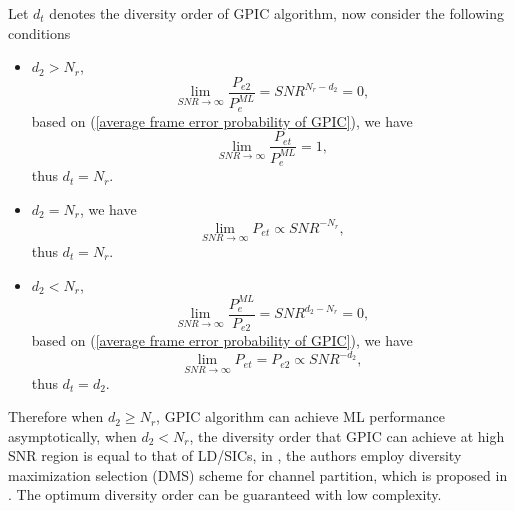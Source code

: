 \documentclass[12pt, draftclsnofoot, onecolumn]{IEEEtran}
\begin{document}
Let $d_{t}$ denotes the diversity order of GPIC algorithm, now consider the following conditions
\begin{itemize}
\item $d_{2}>N_{r}$,
\begin{equation}
\lim_{SNR\to\infty}\frac{P_{e2}}{P^{ML}_{e}}=SNR^{N_{r}-d_{2}}=0,
\label{condition1sub1}
\end{equation}
based on (\ref{average frame error probability of GPIC}), we have
\begin{equation}
\lim_{SNR\to\infty}\frac{P_{et}}{P^{ML}_{e}}=1,
\label{condition1sub2}
\end{equation}
thus $d_{t}=N_{r}$.
\item $d_2=N_{r}$,
we have 
\begin{equation}
\lim_{SNR\to\infty}P_{et}\propto SNR^{-N_{r}},
\label{condition2sub1}
\end{equation}
thus $d_{t}=N_{r}$.
\item $d_{2}<N_{r}$,
\begin{equation}
\lim_{SNR\to\infty}\frac{P^{ML}_{e}}{P_{e2}}=SNR^{d_{2}-N_{r}}=0,
\label{condition3sub1}
\end{equation}
based on (\ref{average frame error probability of GPIC}), we have  
\begin{equation}
\lim_{SNR\to\infty}P_{et}=P_{e2}\propto SNR^{-d_{2}},
\label{condition3sub2}
\end{equation}
thus 
$d_{t}=d_{2}$.
\end{itemize} 
Therefore when $d_{2}\geq N_{r}$, GPIC algorithm can achieve ML performance asymptotically, when $d_{2}<N_{r}$, the diversity order that GPIC can achieve at high SNR region is equal to that of LD/SICs, in \cite{radji2009interference}, the authors employ diversity maximization selection (DMS) scheme for channel partition, which is proposed in \cite{zhang2006diversity}. The optimum diversity order can be guaranteed with low complexity.
\end{document}
